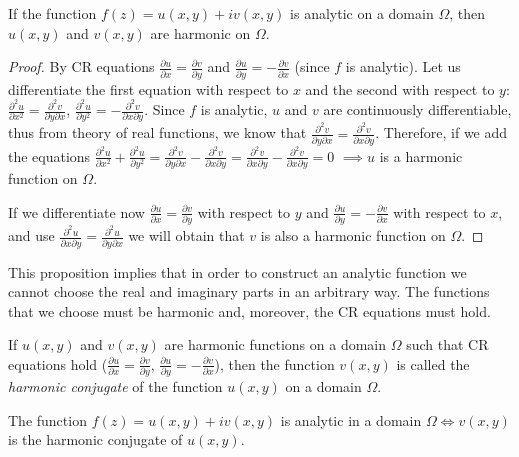 \documentclass[12pt]{article}
\begin{document}
\begin{proposition}
If the function $f(z) = u(x,y) + iv(x,y)$ is analytic on a domain $\Omega$, then $u(x,y)$ and $v(x,y)$ are harmonic on $\Omega$.
\end{proposition}

\begin{proof}
By CR equations $\frac{\partial u}{\partial x} = \frac{\partial v}{\partial y}$ and $\frac{\partial u}{\partial y} = -\frac{\partial v}{\partial x}$ (since $f$ is analytic). Let us differentiate the first equation with respect to $x$ and the second with respect to $y$:
$\frac{\partial^2 u}{\partial x^2} = \frac{\partial^2 v}{\partial y \partial x}$, $\frac{\partial^2 u}{\partial y^2} = -\frac{\partial^2 v}{\partial x \partial y}$.
Since $f$ is analytic, $u$ and $v$ are continuously differentiable, thus from theory of real functions, we know that $\frac{\partial^2 v}{\partial y \partial x} = \frac{\partial^2 v}{\partial x \partial y}$.
Therefore, if we add the equations $\frac{\partial^2 u}{\partial x^2} + \frac{\partial^2 u}{\partial y^2} = \frac{\partial^2 v}{\partial y \partial x} - \frac{\partial^2 v}{\partial x \partial y} = \frac{\partial^2 v}{\partial x \partial y} - \frac{\partial^2 v}{\partial x \partial y} = 0$
$\implies u$ is a harmonic function on $\Omega$.

If we differentiate now $\frac{\partial u}{\partial x} = \frac{\partial v}{\partial y}$ with respect to $y$ and $\frac{\partial u}{\partial y} = -\frac{\partial v}{\partial x}$ with respect to $x$, and use $\frac{\partial^2 u}{\partial x \partial y} = \frac{\partial^2 u}{\partial y \partial x}$ we will obtain that $v$ is also a harmonic function on $\Omega$.
\end{proof}

This proposition implies that in order to construct an analytic function we cannot choose the real and imaginary parts in an arbitrary way. The functions that we choose must be harmonic and, moreover, the CR equations must hold.

\begin{definition}
If $u(x,y)$ and $v(x,y)$ are harmonic functions on a domain $\Omega$ such that CR equations hold ($\frac{\partial u}{\partial x} = \frac{\partial v}{\partial y}$, $\frac{\partial u}{\partial y} = -\frac{\partial v}{\partial x}$), then the function $v(x,y)$ is called the \emph{harmonic conjugate} of the function $u(x,y)$ on a domain $\Omega$.
\end{definition}

\begin{proposition}
The function $f(z) = u(x,y) + iv(x,y)$ is analytic in a domain $\Omega \iff v(x,y)$ is the harmonic conjugate of $u(x,y)$.
\end{proposition}
\end{document}
